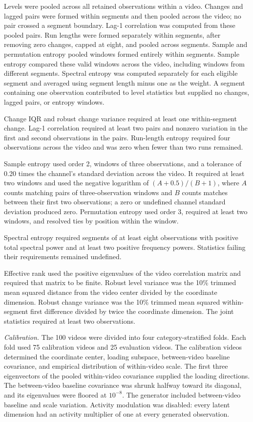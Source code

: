\documentclass[
]{article}
\begin{document}
Levels were pooled across all retained observations within a video.
Changes and lagged pairs were formed within segments and then pooled
across the video; no pair crossed a segment boundary. Lag-1 correlation
was computed from these pooled pairs. Run lengths were formed separately
within segments, after removing zero changes, capped at eight, and
pooled across segments. Sample and permutation entropy pooled windows
formed entirely within segments. Sample entropy compared these valid
windows across the video, including windows from different segments.
Spectral entropy was computed separately for each eligible segment and
averaged using segment length minus one as the weight. A segment
containing one observation contributed to level statistics but supplied
no changes, lagged pairs, or entropy windows.

Change IQR and robust change variance required at least one
within-segment change. Lag-1 correlation required at least two pairs and
nonzero variation in the first and second observations in the pairs.
Run-length entropy required four observations across the video and was
zero when fewer than two runs remained.

Sample entropy used order 2, windows of three observations, and a
tolerance of 0.20 times the channel's standard deviation across the
video. It required at least two windows and used the negative logarithm
of \((A+0.5)/(B+1)\), where \(A\) counts matching pairs of
three-observation windows and \(B\) counts matches between their first
two observations; a zero or undefined channel standard deviation
produced zero. Permutation entropy used order 3, required at least two
windows, and resolved ties by position within the window.

Spectral entropy required segments of at least eight observations with
positive total spectral power and at least two positive frequency
powers. Statistics failing their requirements remained undefined.

Effective rank used the positive eigenvalues of the video correlation
matrix and required that matrix to be finite. Robust level variance was
the 10\% trimmed mean squared distance from the video center divided by
the coordinate dimension. Robust change variance was the 10\% trimmed
mean squared within-segment first difference divided by twice the
coordinate dimension. The joint statistics required at least two
observations.

\emph{Calibration.} The 100 videos were divided into four
category-stratified folds. Each fold used 75 calibration videos and 25
evaluation videos. The calibration videos determined the coordinate
center, loading subspace, between-video baseline covariance, and
empirical distribution of within-video scale. The first three
eigenvectors of the pooled within-video covariance supplied the loading
directions. The between-video baseline covariance was shrunk halfway
toward its diagonal, and its eigenvalues were floored at \(10^{-8}\).
The generator included between-video baseline and scale variation.
Activity modulation was disabled: every latent dimension had an activity
multiplier of one at every generated observation.
\end{document}
